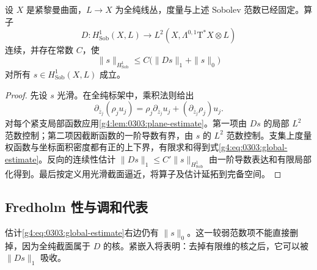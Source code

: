 \begin{proposition}
	\label{g4:prop:0303:global-estimate}
	设 \(X\) 是紧黎曼曲面，\(L\to X\) 为全纯线丛，度量与上述 Sobolev 范数已经固定。算子
	\[
		D:H^1_{\mathrm{Sob}}(X,L)\longrightarrow L^2(X,\Lambda^{0,1}\mathrm{T}^*X\otimes L)
	\]
	连续，并存在常数 \(C\)，使
	\begin{equation}
		\label{g4:eq:0303:global-estimate}
		\|s\|_{H^1_{\mathrm{Sob}}}
		\le C\bigl(\|Ds\|_1+\|s\|_0\bigr)
	\end{equation}
	对所有 \(s\in H^1_{\mathrm{Sob}}(X,L)\) 成立。
\end{proposition}
\begin{proof}
	先设 \(s\) 光滑。在全纯标架中，乘积法则给出
	\[
		\partial_{\overline z_j}(\rho_j u_j)
		=\rho_j\partial_{\overline z_j}u_j+
		(\partial_{\overline z_j}\rho_j)u_j.
	\]
	对每个紧支局部函数应用\cref{g4:lem:0303:plane-estimate}。第一项由 \(Ds\) 的局部 \(L^2\) 范数控制；第二项因截断函数的一阶导数有界，由 \(s\) 的 \(L^2\) 范数控制。支集上度量权函数与坐标面积密度都有正的上下界，有限求和得到式\eqref{g4:eq:0303:global-estimate}。反向的连续性估计 \(\|Ds\|_1\le C'\|s\|_{H^1_{\mathrm{Sob}}}\) 由一阶导数表达和有限局部化得到。最后按定义用光滑截面逼近，将算子及估计延拓到完备空间。
\end{proof}

\subsection{Fredholm 性与调和代表}
\label{g4:subsec:0303:02}
估计\eqref{g4:eq:0303:global-estimate}右边仍有 \(\|s\|_0\)。这一较弱范数项不能直接删掉，因为全纯截面属于 \(D\) 的核。紧嵌入将表明：去掉有限维的核之后，它可以被 \(\|Ds\|_1\) 吸收。

